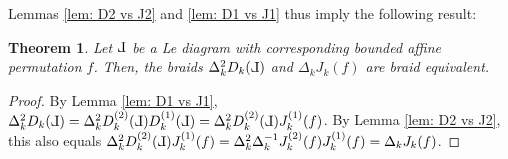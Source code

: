 \documentclass[10pt]{amsart}
\theoremstyle{plain}
\newtheorem{thm}{Theorem}[section]
\theoremstyle{definition}
\theoremstyle{remark}
\numberwithin{equation}{section}
\def\Le{\reflectbox{$\mathrm{L}$}}
\begin{document}

\noindent Lemmas \ref{lem: D2 vs J2} and \ref{lem: D1 vs J1} thus imply the following result:

\begin{thm}\label{thm:Lebraid_is_jugglingbraid}
Let $\Le$ be a Le diagram with corresponding bounded affine permutation $f$. Then, the braids $\Delta_k^{2}D_{k}(\Le)$ and $\Delta_kJ_{k}(f)$ are braid equivalent. 
\end{thm}
\begin{proof}
By Lemma \ref{lem: D1 vs J1}, $\Delta_{k}^{2}D_{k}(\Le)=
\Delta_{k}^{2}D_k^{(2)}(\Le)D_{k}^{(1)}(\Le)
=\Delta_{k}^{2}D_{k}^{(2)}(\Le)J_{k}^{(1)}(f)$. By Lemma \ref{lem: D2 vs J2}, this also equals $\Delta_{k}^{2}D_{k}^{(2)}(\Le)J_{k}^{(1)}(f) = \Delta_k^{2}\Delta_k^{-1}J^{(2)}_{k}(f)J_{k}^{(1)}(f) = \Delta_{k}J_k(f)$.
\end{proof}
\end{document}
